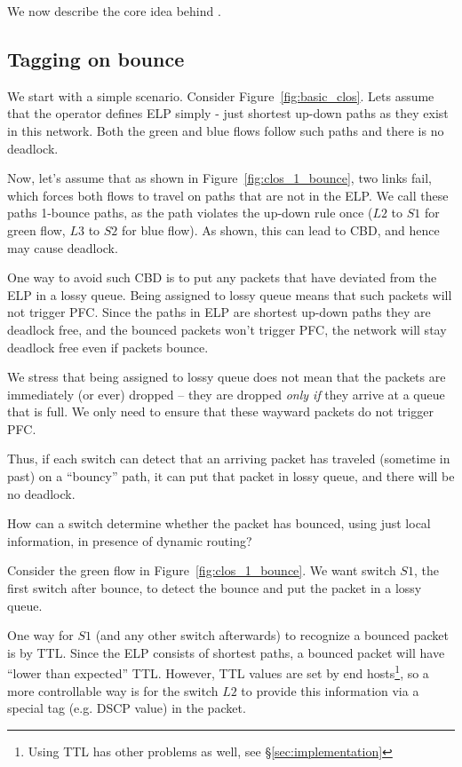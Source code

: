 We now describe the core idea behind \sysname{}.

\subsection{Tagging on bounce}
\label{subsec:tag}

We start with a simple scenario. Consider Figure~\ref{fig:basic_clos}. Lets
assume that the operator defines ELP simply - just shortest up-down paths as
they exist in this network.  Both the green and blue flows follow such paths and
there is no deadlock.

Now, let's assume that as shown in Figure~\ref{fig:clos_1_bounce}, two links
fail, which forces both flows to travel on paths that are not in the ELP. We
call these paths 1-bounce paths, as the path violates the up-down rule once
($L2$ to $S1$ for green flow, $L3$ to $S2$ for blue flow). As shown, this can
lead to CBD, and hence may cause deadlock.

One way to avoid such CBD is to put any packets that have deviated from the ELP
 in a lossy queue.  Being assigned to lossy queue means that such packets
will not trigger PFC. Since the paths in ELP are shortest up-down paths they are
deadlock free, and the bounced packets won't trigger PFC, the network will stay
deadlock free even if packets bounce.

We stress that being assigned to lossy queue does not mean that the packets are
immediately (or ever) dropped -- they are dropped {\em only if} they arrive at a
queue that is full. We only need to ensure that these wayward packets do not trigger
PFC.

Thus, if each switch can detect that an arriving packet has traveled (sometime
in past) on a ``bouncy'' path, it can put that packet in lossy queue, and there
will be no deadlock.

How can a switch determine whether the packet has bounced, using just local
information, in presence of dynamic routing?

Consider the green flow in Figure~\ref{fig:clos_1_bounce}.  We want switch $S1$,
the first switch after bounce, to detect the bounce and put the packet in a
lossy queue.

One way for $S1$ (and any other switch afterwards) to recognize a bounced packet
is by TTL. Since the ELP consists of shortest paths, a bounced packet will have
``lower than expected'' TTL. However, TTL values are set by end
hosts\footnote{Using TTL has other problems as well, see \S\ref{sec:implementation}}, so a
more controllable way is for the switch $L2$ to provide this information via a
special tag (e.g. DSCP value) in the packet. 

